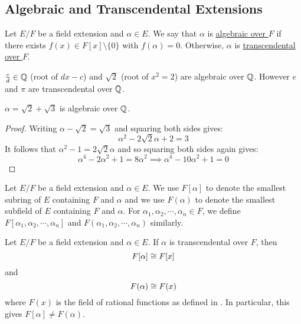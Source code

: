 \documentclass[11pt]{article}
\begin{document}
\subsection{Algebraic and Transcendental Extensions}

\begin{definition}
    Let $E/F$ be a field extension and $\alpha\in E$. We say that $\alpha$ is \ul{algebraic over $F$} if there exists $f(x)\in F[x]\setminus\{0\}$ with $f(\alpha)=0$. Otherwise, $\alpha$ is \ul{transcendental over $F$}.
\end{definition}

\begin{example}
    $\frac cd\in\mathbb{Q}$ (root of $dx-c$) and $\sqrt{2}$ (root of $x^2=2$) are algebraic over $\mathbb{Q}$. However $e$ and $\pi$ are transcendental over $\mathbb{Q}$.
\end{example}

\begin{example}
    $\alpha=\sqrt2+\sqrt3$ is algebraic over $\mathbb{Q}$.
\end{example}

\begin{proof}
    Writing $\alpha-\sqrt2=\sqrt3$ and squaring both sides gives:
    \[\alpha^2-2\sqrt2\alpha+2=3\]
    It follows that $\alpha^2-1=2\sqrt2\alpha$ and so squaring both sides again gives:
    \[\alpha^4-2\alpha^2+1=8\alpha^2\implies\alpha^4-10\alpha^2+1=0\]
\end{proof}

\begin{notation}
    Let $E/F$ be a field extension and $\alpha\in E$. We use $F[\alpha]$ to denote the smallest subring of $E$ containing $F$ and $\alpha$ and we use $F(\alpha)$ to denote the smallest subfield of $E$ containing $F$ and $\alpha$. For $\alpha_1,\alpha_2,\cdots,\alpha_n\in F$, we define $F[\alpha_1,\alpha_2,\cdots,\alpha_n]$ and $F(\alpha_1,\alpha_2,\cdots,\alpha_n)$ similarly.
\end{notation}

\begin{theorem}
    Let $E/F$ be a field extension and $\alpha\in E$. If $\alpha$ is transcendental over $F$, then
    \[F[\alpha]\cong F[x]\]
    and
    \[F(\alpha)\cong F(x)\]
    where $F(x)$ is the field of rational functions as defined in . In particular, this gives $F[\alpha]\neq F(\alpha)$.
\end{theorem}
\end{document}
